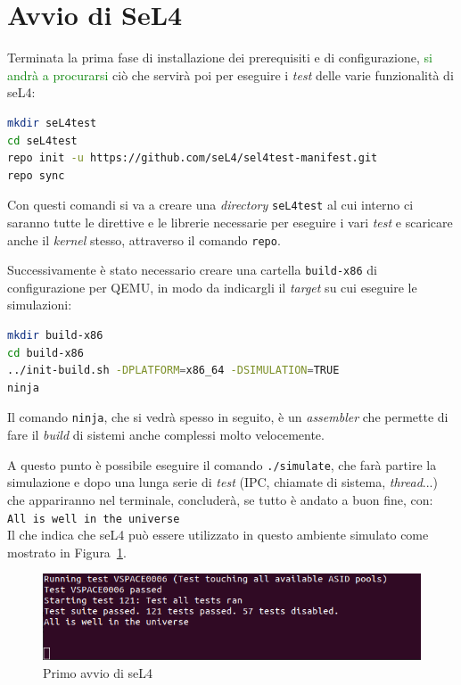 \section{Avvio di SeL4}
Terminata la prima fase di installazione dei prerequisiti e di configurazione, \textcolor{green}{si andrà a procurarsi} ciò che servirà poi per eseguire i \textit{test} delle varie funzionalità di seL4:
\begin{lstlisting}[language=bash]
mkdir seL4test
cd seL4test
repo init -u https://github.com/seL4/sel4test-manifest.git
repo sync
\end{lstlisting}

Con questi comandi si va a creare una \textit{directory} \texttt{seL4test} al cui interno ci saranno tutte le direttive e le librerie necessarie per eseguire i vari \textit{test} e scaricare anche il \textit{kernel} stesso, attraverso il comando \texttt{repo}.

Successivamente è stato necessario creare una cartella \texttt{build-x86} di configurazione per QEMU, in modo da indicargli il \textit{target} su cui eseguire le simulazioni:
\begin{lstlisting}[language=bash]
mkdir build-x86
cd build-x86
../init-build.sh -DPLATFORM=x86_64 -DSIMULATION=TRUE
ninja
\end{lstlisting}

Il comando \texttt{ninja}, che si vedrà spesso in seguito, è un \textit{assembler} che permette di fare il \textit{build} di sistemi anche complessi molto velocemente.

A questo punto è possibile eseguire il comando \texttt{./simulate}, che farà partire la simulazione e dopo una lunga serie di \textit{test} (IPC, chiamate di sistema, \textit{thread}...) che appariranno nel terminale, concluderà, se tutto è andato a buon fine, con:\\
\texttt{All is well in the universe}\\
Il che indica che seL4 può essere utilizzato in questo ambiente simulato come mostrato in Figura~\ref{fig:PrimaSimulazione}.
\begin{figure}[H]
  \includegraphics[width=\linewidth]{img/PrimaSimulazione.png}
  \caption{Primo avvio di seL4}
  \label{fig:PrimaSimulazione}
\end{figure}


